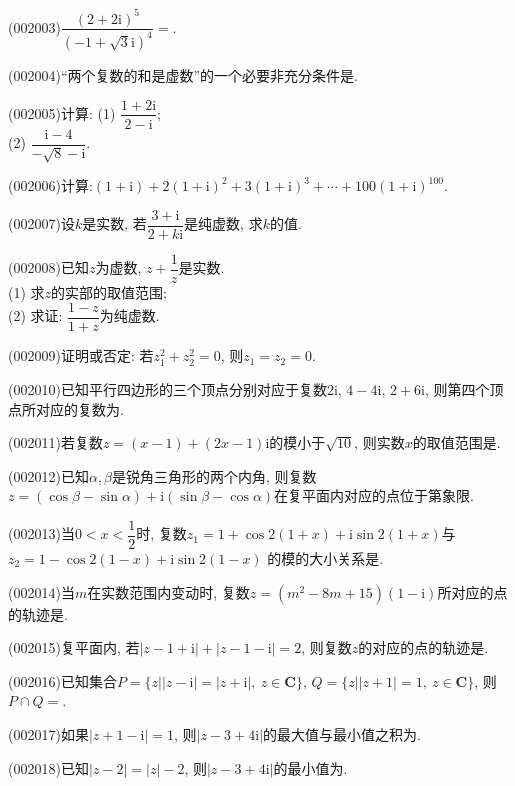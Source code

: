 \item (002003)$\dfrac{(2+2\mathrm{i})^5}{(-1+\sqrt{3}\mathrm{i})^4}=$.
\item (002004)``两个复数的和是虚数''的一个必要非充分条件是.
\item (002005)计算: (1) $\dfrac{1+2\mathrm{i}}{2-\mathrm{i}}$; \\ 
(2) $\dfrac{\mathrm{i}-4}{-\sqrt{8}-\mathrm{i}}$.
\item (002006)计算:$(1+\mathrm{i})+2(1+\mathrm{i})^2+3(1+\mathrm{i})^3+\cdots+100(1+\mathrm{i})^{100}$.
\item (002007)设$k$是实数, 若$\dfrac{3+\mathrm{i}}{2+k\mathrm{i}}$是纯虚数, 求$k$的值.
\item (002008)已知$z$为虚数, $z+\dfrac{1}{z}$是实数.\\ 
(1) 求$z$的实部的取值范围;\\ 
(2) 求证: $\dfrac{1-z}{1+z}$为纯虚数.
\item (002009)证明或否定: 若$z_1^2+z_2^2=0$, 则$z_1=z_2=0$.
\item (002010)已知平行四边形的三个顶点分别对应于复数$2\mathrm{i}$, $4-4\mathrm{i}$, $2+6\mathrm{i}$, 则第四个顶点所对应的复数为.
\item (002011)若复数$z=(x-1)+(2x-1)\mathrm{i}$的模小于$\sqrt{10}$, 则实数$x$的取值范围是.
\item (002012)已知$\alpha,\beta$是锐角三角形的两个内角, 则复数$z=(\cos\beta-\sin\alpha)+\mathrm{i}(\sin\beta-\cos\alpha)$在复平面内对应的点位于第象限.
\item (002013)当$0<x<\dfrac{1}{2}$时, 复数$z_1=1+\cos 2(1+x)+\mathrm{i} \sin 2(1+x)$与$z_2=1-\cos 2(1-x)+\mathrm{i} \sin 2(1-x)$ 的模的大小关系是.
\item (002014)当$m$在实数范围内变动时, 复数$z=(m^2-8m+15)(1-\mathrm{i})$所对应的点的轨迹是.
\item (002015)复平面内, 若$|z-1+\mathrm{i}|+|z-1-\mathrm{i}|=2$, 则复数$z$的对应的点的轨迹是.
\item (002016)已知集合$P=\{z||z-\mathrm{i}|=|z+\mathrm{i}|, \ z\in \mathbf{C}\}$, $Q=\{z||z+1|=1, \ z\in \mathbf{C}\}$, 则$P\cap Q=$.
\item (002017)如果$|z+1-\mathrm{i}|=1$, 则$|z-3+4\mathrm{i}|$的最大值与最小值之积为.
\item (002018)已知$|z-2|=|z|-2$, 则$|z-3+4\mathrm{i}|$的最小值为.
